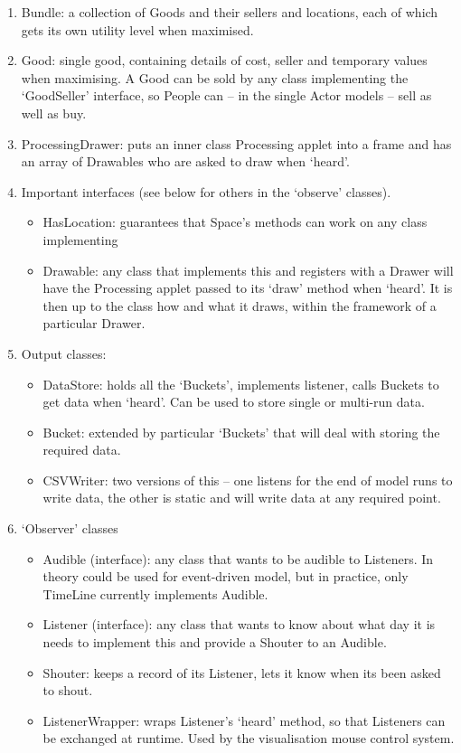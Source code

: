 \begin{enumerate}
	\item Bundle: a collection of Goods and their sellers and locations, each of which gets its own utility level when maximised.
	\item Good: single good, containing details of cost, seller and temporary values when maximising. A Good can be sold by any class implementing the `GoodSeller' interface, so People can – in the single Actor models – sell as well as buy.
	\item ProcessingDrawer: puts an inner class Processing applet into a frame and has an array of Drawables who are asked to draw when `heard'. 
	\item Important interfaces (see below for others in the `observe' classes).
		\begin{itemize}
			\item HasLocation: guarantees that Space's methods can work on any class implementing
			\item Drawable: any class that implements this and registers with a Drawer will have the Processing applet passed to its `draw' method when `heard'. It is then up to the class how and what it draws, within the framework of a particular Drawer. 
		\end{itemize}
	\item Output classes:
		\begin{itemize}
			\item DataStore: holds all the `Buckets', implements listener, calls Buckets to get data when `heard'. Can be used to store single or multi-run data.
			\item Bucket: extended by particular `Buckets' that will deal with storing the required data.
			\item CSVWriter: two versions of this – one listens for the end of model runs to write data, the other is static and will write data at any required point.
		\end{itemize}
	\item `Observer' classes
		\begin{itemize}
			\item Audible (interface): any class that wants to be audible to Listeners. In theory could be used for event-driven model, but in practice, only TimeLine currently implements Audible.
			\item Listener (interface): any class that wants to know about what day it is needs to implement this and provide a Shouter to an Audible.
			\item Shouter: keeps a record of its Listener, lets it know when its been asked to shout. 
			\item ListenerWrapper: wraps Listener's `heard' method, so that Listeners can be exchanged at runtime. Used by the visualisation mouse control system. 
		\end{itemize}	
\end{enumerate}

